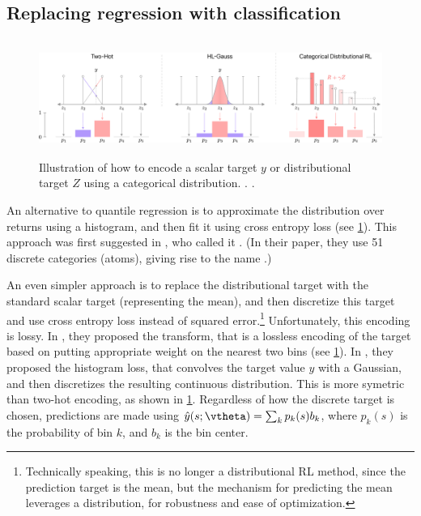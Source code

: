 \subsection{Replacing regression with classification}
\label{sec:classifRL}
\label{sec:C51}
\label{sec:catDQN}



\begin{figure}
\centering
\includegraphics[height=1.5in]{figs/twoHot.pdf}
\caption{
  Illustration of how to encode a scalar target $y$
  or distributional target $Z$
using a categorical distribution.
.
.
}
\label{fig:twoHot}
\end{figure}


An alternative to quantile regression
is to approximate the distribution over returns
using a histogram, and then fit it
using cross entropy loss (see \cref{fig:twoHot}).
This approach was first suggested in \citep{Bellemare2017},
who called it  .
(In their paper, they use 51 discrete categories (atoms),
giving rise to the name .) 

An even simpler approach is to replace the distributional
target with the standard scalar target (representing the mean),
and then discretize this target
and use cross entropy loss instead of squared error.\footnote{
%
Technically speaking, this is no longer a distributional RL method,
since the prediction target is the mean,
but the mechanism for predicting the mean leverages a distribution,
for robustness and ease of optimization.
}
Unfortunately, this encoding is lossy.
In  \citep{Schrittwieser2020}, they
proposed the  transform,
that is a lossless encoding of the target based on putting
appropriate weight on the nearest two bins (see \cref{fig:twoHot}).
In \citep{Imani2018}, they proposed the
 histogram loss,
that convolves the target value $y$ with a Gaussian,
and then discretizes the resulting continuous distribution.
This is  more symetric than two-hot encoding, as shown in \cref{fig:twoHot}.
Regardless of how the discrete target is chosen,
predictions are made using
$\hat{y}(s;\vtheta) = \sum_k p_k(s) b_k$,
where $p_k(s)$ is the probability of bin $k$,
and $b_k$ is the bin center.

